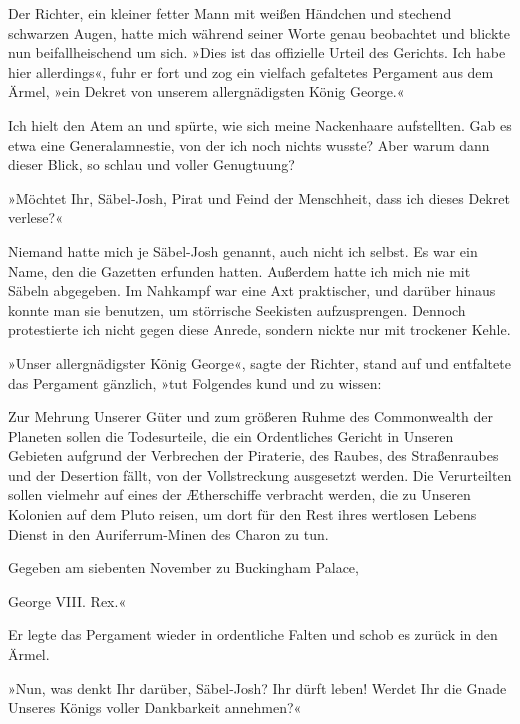 \bigpar

Der Richter, ein kleiner fetter Mann mit weißen Händchen und
stechend schwarzen Augen, hatte mich während seiner Worte genau
beobachtet und blickte nun beifallheischend um sich. »Dies ist das
offizielle Urteil des Gerichts. Ich habe hier allerdings«, fuhr er
fort und zog ein vielfach gefaltetes Pergament aus dem Ärmel, »ein
Dekret von unserem allergnädigsten König George.«

Ich hielt den Atem an und spürte, wie sich meine Nackenhaare
aufstellten. Gab es etwa eine Generalamnestie, von der ich noch
nichts wusste? Aber warum dann dieser Blick, so schlau und voller
Genugtuung?

»Möchtet Ihr, Säbel-Josh, Pirat und Feind der Menschheit, dass ich
dieses Dekret verlese?«

Niemand hatte mich je Säbel-Josh genannt, auch nicht ich selbst. Es
war ein Name, den die Gazetten erfunden hatten. Außerdem hatte ich
mich nie mit Säbeln abgegeben. Im Nahkampf war eine Axt
praktischer, und darüber hinaus konnte man sie benutzen, um
störrische Seekisten aufzusprengen. Dennoch protestierte ich nicht
gegen diese Anrede, sondern nickte nur mit trockener Kehle.

»Unser allergnädigster König George«, sagte der Richter, stand auf
und entfaltete das Pergament gänzlich, »tut Folgendes kund und zu
wissen:

\bigpar

\begin{dekret}
Zur Mehrung Unserer Güter und zum größeren Ruhme des Commonwealth
der Planeten sollen die Todesurteile, die ein Ordentliches Gericht
in Unseren Gebieten aufgrund der Verbrechen der Piraterie, des
Raubes, des Straßenraubes und der Desertion fällt, von der
Vollstreckung ausgesetzt werden. Die Verurteilten sollen vielmehr
auf eines der Ætherschiffe verbracht werden, die zu Unseren Kolonien
auf dem Pluto reisen, um dort für den Rest ihres wertlosen Lebens
Dienst in den Auriferrum-Minen des Charon zu tun.

Gegeben am siebenten November zu Buckingham Palace,
\begin{flushright}
George VIII. Rex.«
\end{flushright}
\end{dekret}

Er legte das Pergament wieder in ordentliche Falten und schob es
zurück in den Ärmel.

»Nun, was denkt Ihr darüber, Säbel-Josh? Ihr dürft leben! Werdet
Ihr die Gnade Unseres Königs voller Dankbarkeit annehmen?«

